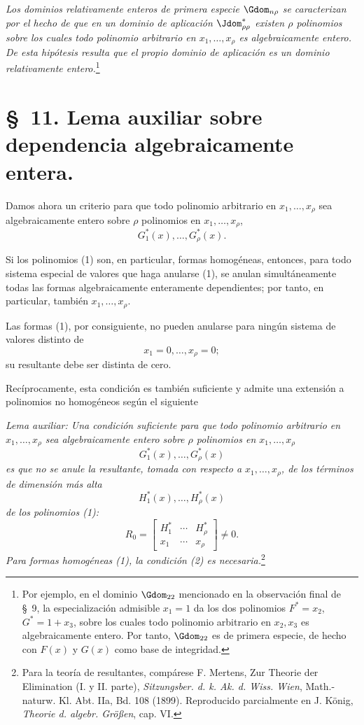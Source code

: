 \documentclass[11pt]{article}
\begin{document}
\emph{Los dominios relativamente enteros de primera especie $\Gdom_{n\rho}$ se caracterizan por el hecho de que en un dominio de aplicación $\Jdom^*_{\rho\rho}$ existen $\rho$ polinomios sobre los cuales todo polinomio arbitrario en $x_1,\ldots,x_\rho$ es algebraicamente entero. De esta hipótesis resulta que el propio dominio de aplicación es un dominio relativamente entero.}\footnote{Por ejemplo, en el dominio $\Gdom_{22}$ mencionado en la observación final de \S\ 9, la especialización admisible $x_1=1$ da los dos polinomios $F^*=x_2$, $G^*=1+x_3$, sobre los cuales todo polinomio arbitrario en $x_2,x_3$ es algebraicamente entero. Por tanto, $\Gdom_{22}$ es de primera especie, de hecho con $F(x)$ y $G(x)$ como base de integridad.}

\section*{\S\ 11. Lema auxiliar sobre dependencia algebraicamente entera.}

Damos ahora un criterio para que todo polinomio arbitrario en $x_1,\ldots,x_\rho$ sea algebraicamente entero sobre $\rho$ polinomios en $x_1,\ldots,x_\rho$,
\begin{equation}
  G_1^*(x),\ldots,G_\rho^*(x).
\tag{1}
\end{equation}

Si los polinomios (1) son, en particular, formas homogéneas, entonces, para todo sistema especial de valores que haga anularse (1), se anulan simultáneamente todas las formas algebraicamente enteramente dependientes; por tanto, en particular, también $x_1,\ldots,x_\rho$.

Las formas (1), por consiguiente, no pueden anularse para ningún sistema de valores distinto de
\[
  x_1=0,
  \ldots,
  x_\rho=0;
\]
su resultante debe ser distinta de cero.

Recíprocamente, esta condición es también suficiente y admite una extensión a polinomios no homogéneos según el siguiente

\emph{Lema auxiliar: Una condición suficiente para que todo polinomio arbitrario en $x_1,\ldots,x_\rho$ sea algebraicamente entero sobre $\rho$ polinomios en $x_1,\ldots,x_\rho$}
\[
  G_1^*(x),\ldots,G_\rho^*(x)
\]
\emph{es que no se anule la resultante, tomada con respecto a $x_1,\ldots,x_\rho$, de los términos de dimensión más alta}
\[
  H_1^*(x),\ldots,H_\rho^*(x)
\]
\emph{de los polinomios (1):}
\begin{equation}
  R_0=\left[
  \begin{array}{ccc}
    H_1^*&\cdots&H_\rho^*\\
    x_1&\cdots&x_\rho
  \end{array}
  \right]\ne0.
\tag{2}
\end{equation}
\emph{Para formas homogéneas (1), la condición (2) es necesaria.}\footnote{Para la teoría de resultantes, compárese F. Mertens, Zur Theorie der Elimination (I. y II. parte), \emph{Sitzungsber. d. k. Ak. d. Wiss. Wien}, Math.-naturw. Kl. Abt. IIa, Bd. 108 (1899). Reproducido parcialmente en J. König, \emph{Theorie d. algebr. Größen}, cap. VI.}
\end{document}
